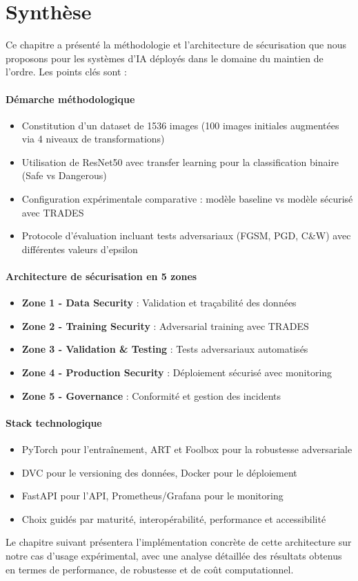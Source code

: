 \section*{Synthèse}

Ce chapitre a présenté la méthodologie et l'architecture de sécurisation que nous proposons pour les systèmes d'IA déployés dans le domaine du maintien de l'ordre. Les points clés sont :

\paragraph{Démarche méthodologique}
\begin{itemize}
    \item Constitution d'un dataset de 1536 images (100 images initiales augmentées via 4 niveaux de transformations)
    \item Utilisation de ResNet50 avec transfer learning pour la classification binaire (Safe vs Dangerous)
    \item Configuration expérimentale comparative : modèle baseline vs modèle sécurisé avec TRADES
    \item Protocole d'évaluation incluant tests adversariaux (FGSM, PGD, C\&W) avec différentes valeurs d'epsilon
\end{itemize}

\paragraph{Architecture de sécurisation en 5 zones}
\begin{itemize}
    \item \textbf{Zone 1 - Data Security} : Validation et traçabilité des données
    \item \textbf{Zone 2 - Training Security} : Adversarial training avec TRADES
    \item \textbf{Zone 3 - Validation \& Testing} : Tests adversariaux automatisés
    \item \textbf{Zone 4 - Production Security} : Déploiement sécurisé avec monitoring
    \item \textbf{Zone 5 - Governance} : Conformité et gestion des incidents
\end{itemize}

\paragraph{Stack technologique}
\begin{itemize}
    \item PyTorch pour l'entraînement, ART et Foolbox pour la robustesse adversariale
    \item DVC pour le versioning des données, Docker pour le déploiement
    \item FastAPI pour l'API, Prometheus/Grafana pour le monitoring
    \item Choix guidés par maturité, interopérabilité, performance et accessibilité
\end{itemize}

Le chapitre suivant présentera l'implémentation concrète de cette architecture sur notre cas d'usage expérimental, avec une analyse détaillée des résultats obtenus en termes de performance, de robustesse et de coût computationnel.
